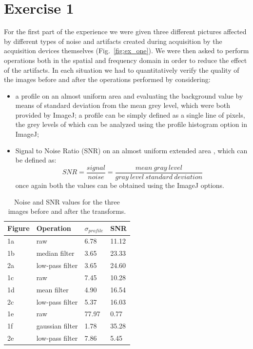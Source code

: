 \documentclass[a4paper]{article}
\begin{document}
\section*{Exercise 1}
For the first part of the experience we were given three different pictures affected by different types of noise and artifacts created during acquisition by the acquisition devices themselves (Fig.~\ref{fig:ex_one}). We were then asked to perform operations both in the spatial and frequency domain in order to reduce the effect of the artifacts. In each situation we had to quantitatively verify the quality of the images before and after the operations performed by considering:
\begin{itemize}
 \item a profile on an almost uniform area and evaluating the background value by means of standard deviation from the mean grey level, which were both provided by ImageJ; a profile can be simply defined as a single line of pixels, the grey levels of which can be analyzed using the profile histogram option in ImageJ;
 \item Signal to Noise Ratio (SNR) on an almost uniform extended area , which can be defined as:
 \begin{equation}
 SNR=\frac{signal}{noise}=\frac{mean\ gray\ level}{gray\ level\ standard\ deviation}
 \end{equation}
 once again both the values can be obtained using the ImageJ options.
\end{itemize}

\begin{table}[h]
	\centering
	\begin{tabular}{| l | l | l | l |}
		\hline
		Figure & Operation & $\sigma_{profile}$ & SNR \\ \hline
		1a & raw & 6.78 & 11.12 \\ \hline
		1b & median filter & 3.65 & 23.33 \\ \hline
		2a & low-pass filter & 3.65 & 24.60 \\ \hline
		1c & raw & 7.45 & 10.28 \\ \hline
		1d & mean filter & 4.90 & 16.54 \\ \hline
		2c & low-pass filter & 5.37 & 16.03 \\ \hline
		1e & raw & 77.97 & 0.77 \\ \hline
		1f & gaussian filter & 1.78 & 35.28 \\ \hline
		2e & low-pass filter & 7.86 & 5.45 \\ \hline
	\end{tabular}
  \caption{Noise and SNR values for the three images before and after the transforms.}
  \label{tab:ex_one}
\end{table}
\end{document}

